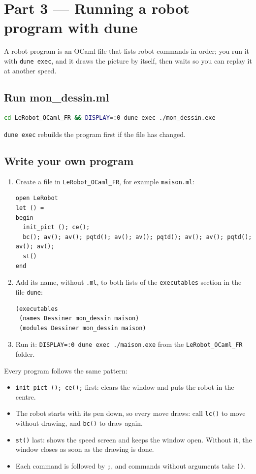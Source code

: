 \documentclass[11pt,a4paper]{article}
\newcommand{\kbd}[1]{\texttt{#1}}
\begin{document}
\section{Part 3 --- Running a robot program with dune}

A robot program is an OCaml file that lists robot commands in order; you run
it with \kbd{dune exec}, and it draws the picture by itself, then waits so
you can replay it at another speed.

\subsection{Run mon\_dessin.ml}
\begin{lstlisting}[language=bash]
cd LeRobot_OCaml_FR && DISPLAY=:0 dune exec ./mon_dessin.exe
\end{lstlisting}
\kbd{dune exec} rebuilds the program first if the file has changed.

\subsection{Write your own program}
\begin{enumerate}
\item Create a file in \kbd{LeRobot\_OCaml\_FR}, for example \kbd{maison.ml}:
\begin{lstlisting}
open LeRobot
let () =
begin
  init_pict (); ce();
  bc(); av(); av(); pqtd(); av(); av(); pqtd(); av(); av(); pqtd(); av(); av();
  st()
end
\end{lstlisting}
\item Add its name, without \kbd{.ml}, to both lists of the
  \kbd{executables} section in the file \kbd{dune}:
\begin{lstlisting}
(executables
 (names Dessiner mon_dessin maison)
 (modules Dessiner mon_dessin maison)
\end{lstlisting}
\item Run it: \kbd{DISPLAY=:0 dune exec ./maison.exe} from the
  \kbd{LeRobot\_OCaml\_FR} folder.
\end{enumerate}

Every program follows the same pattern:
\begin{itemize}
\item \kbd{init\_pict (); ce();} first: clears the window and puts the robot
  in the centre.
\item The robot starts with its pen down, so every move draws: call
  \kbd{lc()} to move without drawing, and \kbd{bc()} to draw again.
\item \kbd{st()} last: shows the speed screen and keeps the window open.
  Without it, the window closes as soon as the drawing is done.
\item Each command is followed by \kbd{;}, and commands without arguments
  take \kbd{()}.
\end{itemize}
\end{document}
